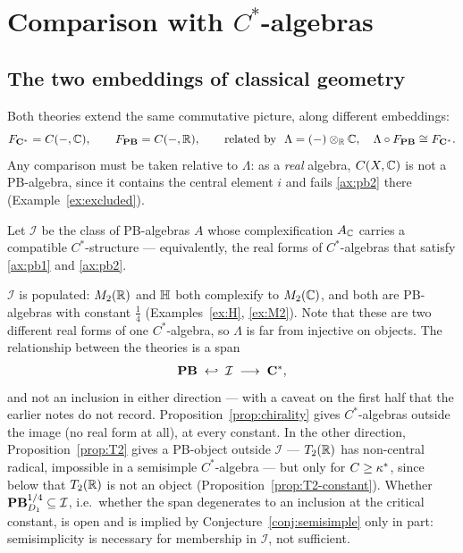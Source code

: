 \section{Comparison with $C^*$-algebras}
\label{sec:cstar}

\subsection{The two embeddings of classical geometry}

Both theories extend the same commutative picture, along different embeddings:
\[
  F_{\mathbf{C}^{*}}=C(-,\mathbb{C}),\qquad F_{\mathbf{PB}}=C(-,\mathbb{R}),
  \qquad\text{related by }\ \Lambda=(-)\otimes_{\mathbb{R}}\mathbb{C},\quad \Lambda\circ F_{\mathbf{PB}}\cong F_{\mathbf{C}^{*}}.
\]
Any comparison must be taken relative to $\Lambda$: as a \emph{real} algebra,
$C(X,\mathbb{C})$ is not a PB-algebra, since it contains the central element $i$ and
fails \eqref{ax:pb2} there (Example~\ref{ex:excluded}).

\begin{definition}\label{def:intersection}
Let $\mathcal{I}$ be the class of PB-algebras $A$ whose complexification
$A_{\mathbb{C}}$ carries a compatible $C^*$-structure --- equivalently, the real forms of
$C^*$-algebras that satisfy \eqref{ax:pb1} and \eqref{ax:pb2}.
\end{definition}

$\mathcal{I}$ is populated: $M_2(\mathbb{R})$ and $\mathbb{H}$ both complexify to $M_2(\mathbb{C})$,
and both are PB-algebras with constant $\tfrac14$ (Examples~\ref{ex:H},
\ref{ex:M2}).  Note that these are two different real forms of one
$C^*$-algebra, so $\Lambda$ is far from injective on objects.  The relationship
between the theories is a span
\[
  \mathbf{PB}\;\hookleftarrow\;\mathcal{I}\;\longrightarrow\;\mathbf{C}^{*},
\]
and not an inclusion in either direction --- with a caveat on the first half
that the earlier notes do not record.  Proposition~\ref{prop:chirality} gives
$C^*$-algebras outside the image (no real form at all), at every constant.  In
the other direction, Proposition~\ref{prop:T2} gives a PB-object outside
$\mathcal{I}$ --- $T_2(\mathbb{R})$ has non-central radical, impossible in a semisimple
$C^*$-algebra --- but only for $C\ge\kappa^*$, since below that $T_2(\mathbb{R})$ is not
an object (Proposition~\ref{prop:T2-constant}).  Whether
$\mathbf{PB}^{1/4}_{D_1}\subseteq\mathcal{I}$, i.e.\ whether the span degenerates to
an inclusion at the critical constant, is open and is implied by
Conjecture~\ref{conj:semisimple} only in part: semisimplicity is necessary for
membership in $\mathcal{I}$, not sufficient.

